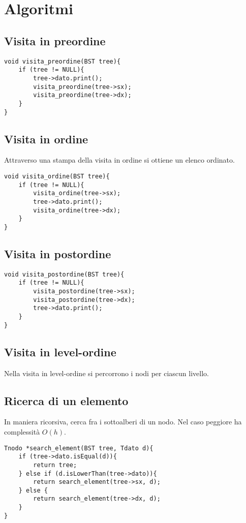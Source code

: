 \section{Algoritmi}
\subsection{Visita in preordine}
\begin{lstlisting}[title={Visita in preordine di un ABR}]
void visita_preordine(BST tree){
    if (tree != NULL){
        tree->dato.print();
        visita_preordine(tree->sx);
        visita_preordine(tree->dx);
    }
}
\end{lstlisting}

\subsection{Visita in ordine}
Attraverso una stampa della visita in ordine si ottiene un elenco ordinato.
\begin{lstlisting}[title={Visita in ordine di un ABR}]
void visita_ordine(BST tree){
    if (tree != NULL){
        visita_ordine(tree->sx);
        tree->dato.print();
        visita_ordine(tree->dx);
    }
}
\end{lstlisting}

\subsection{Visita in postordine}
\begin{lstlisting}[title={Visita in postordine di un ABR}]
void visita_postordine(BST tree){
    if (tree != NULL){
        visita_postordine(tree->sx);
        visita_postordine(tree->dx);
        tree->dato.print();
    }
}
\end{lstlisting}

\subsection{Visita in level-ordine}
Nella visita in level-ordine si percorrono i nodi per ciascun livello.

\subsection{Ricerca di un elemento}
In maniera ricorsiva, cerca fra i sottoalberi di un nodo. Nel caso peggiore ha complessità $O(h)$.
\begin{lstlisting}[title={Ricerca ricorsiva di un elemento in un ABR}]
Tnodo *search_element(BST tree, Tdato d){
    if (tree->dato.isEqual(d)){
        return tree;
    } else if (d.isLowerThan(tree->dato)){
        return search_element(tree->sx, d);
    } else {
        return search_element(tree->dx, d);
    }
}
\end{lstlisting}


